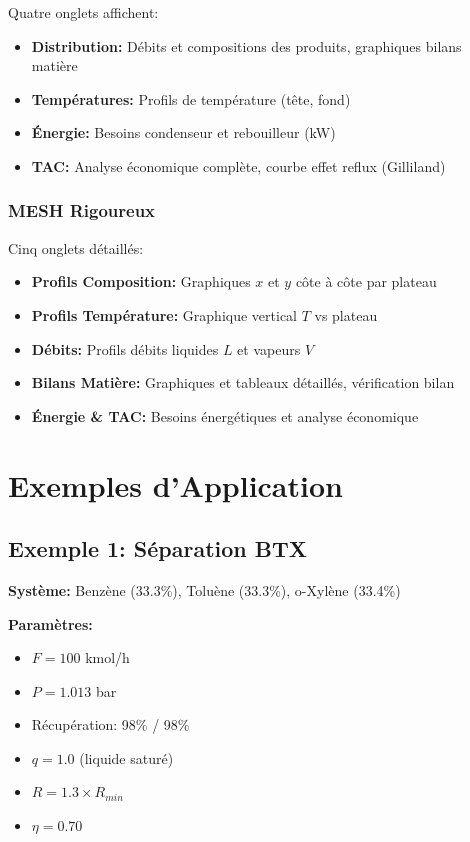 \documentclass[11pt,a4paper]{article}
\begin{document}
Quatre onglets affichent:

\begin{itemize}[leftmargin=*]
    \item \textbf{Distribution:} Débits et compositions des produits, graphiques bilans matière
    \item \textbf{Températures:} Profils de température (tête, fond)
    \item \textbf{Énergie:} Besoins condenseur et rebouilleur (kW)
    \item \textbf{TAC:} Analyse économique complète, courbe effet reflux (Gilliland)
\end{itemize}

\subsubsection{MESH Rigoureux}

Cinq onglets détaillés:

\begin{itemize}[leftmargin=*]
    \item \textbf{Profils Composition:} Graphiques $x$ et $y$ côte à côte par plateau
    \item \textbf{Profils Température:} Graphique vertical $T$ vs plateau
    \item \textbf{Débits:} Profils débits liquides $L$ et vapeurs $V$
    \item \textbf{Bilans Matière:} Graphiques et tableaux détaillés, vérification bilan
    \item \textbf{Énergie \& TAC:} Besoins énergétiques et analyse économique
\end{itemize}

\section{Exemples d'Application}

\subsection{Exemple 1: Séparation BTX}

\textbf{Système:} Benzène (33.3\%), Toluène (33.3\%), o-Xylène (33.4\%)

\textbf{Paramètres:}
\begin{itemize}[leftmargin=*]
    \item $F = 100$ kmol/h
    \item $P = 1.013$ bar
    \item Récupération: 98\% / 98\%
    \item $q = 1.0$ (liquide saturé)
    \item $R = 1.3 \times R_{min}$
    \item $\eta = 0.70$
\end{itemize}
\end{document}
